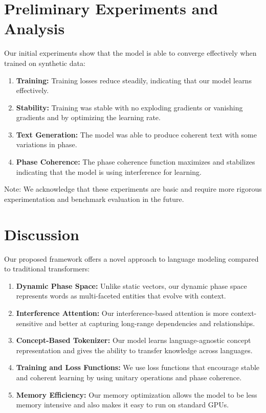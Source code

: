\documentclass[11pt, a4paper]{article}
\begin{document}
\section{Preliminary Experiments and Analysis}
Our initial experiments show that the model is able to converge effectively when trained on synthetic data:
\begin{enumerate}
    \item \textbf{Training:} Training losses reduce steadily, indicating that our model learns effectively.
    \item \textbf{Stability:} Training was stable with no exploding gradients or vanishing gradients and by optimizing the learning rate.
    \item \textbf{Text Generation:} The model was able to produce coherent text with some variations in phase.
    \item \textbf{Phase Coherence:} The phase coherence function maximizes and stabilizes indicating that the model is using interference for learning.
\end{enumerate}
Note: We acknowledge that these experiments are basic and require more rigorous experimentation and benchmark evaluation in the future.

\section{Discussion}

Our proposed framework offers a novel approach to language modeling compared to traditional transformers:
\begin{enumerate}
    \item \textbf{Dynamic Phase Space:} Unlike static vectors, our dynamic phase space represents words as multi-faceted entities that evolve with context.
    \item \textbf{Interference Attention:} Our interference-based attention is more context-sensitive and better at capturing long-range dependencies and relationships.
    \item \textbf{Concept-Based Tokenizer:} Our model learns language-agnostic concept representation and gives the ability to transfer knowledge across languages.
    \item \textbf{Training and Loss Functions:} We use loss functions that encourage stable and coherent learning by using unitary operations and phase coherence.
    \item \textbf{Memory Efficiency:} Our memory optimization allows the model to be less memory intensive and also makes it easy to run on standard GPUs.
\end{enumerate}
\end{document}
